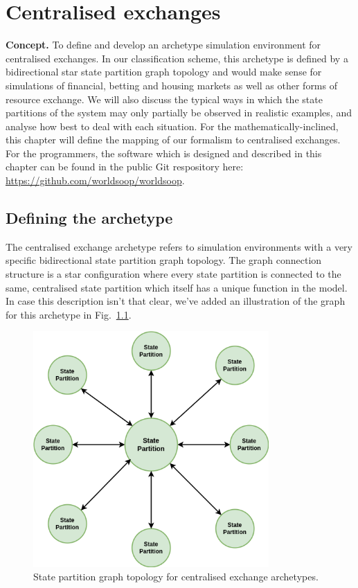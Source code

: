 \chapter{\sffamily Centralised exchanges}

{\bfseries\sffamily Concept.} To define and develop an archetype simulation environment for centralised exchanges. In our classification scheme, this archetype is defined by a bidirectional star state partition graph topology and would make sense for simulations of financial, betting and housing markets as well as other forms of resource exchange. We will also discuss the typical ways in which the state partitions of the system may only partially be observed in realistic examples, and analyse how best to deal with each situation. For the mathematically-inclined, this chapter will define the mapping of our formalism to centralised exchanges. For the programmers, the software which is designed and described in this chapter can be found in the public Git respository here: \href{https://github.com/worldsoop/worldsoop}{https://github.com/worldsoop/worldsoop}.

\section{\sffamily Defining the archetype}

The centralised exchange archetype refers to simulation environments with a very specific bidirectional state partition graph topology. The graph connection structure is a star configuration where every state partition is connected to the same, centralised state partition which itself has a unique function in the model. In case this description isn't that clear, we've added an illustration of the graph for this archetype in Fig.~\ref{fig:state-partition-graph-centralised-exchanges}.

\begin{figure}[h]
\centering
\includegraphics[width=9cm]{images/chapter-10-state-partition-graph.drawio.png}
\caption{State partition graph topology for centralised exchange archetypes.}
\label{fig:state-partition-graph-centralised-exchanges}
\end{figure}

